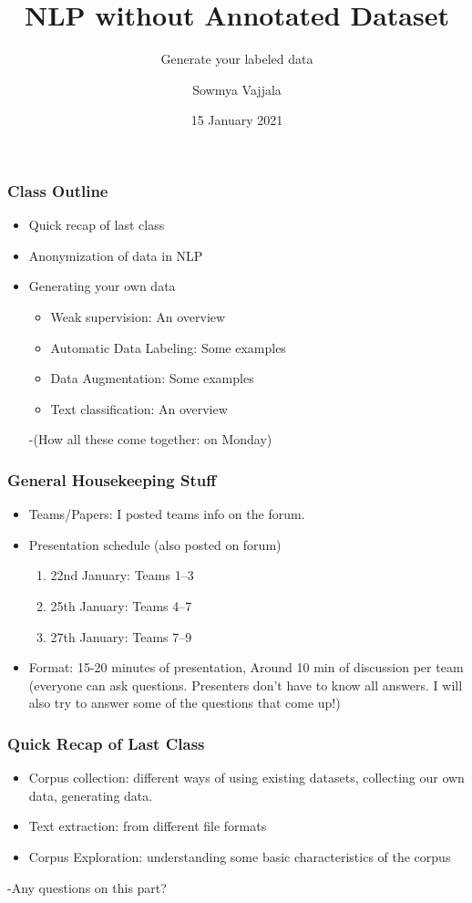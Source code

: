 \documentclass{beamer}
\author[Sowmya Vajjala]{Sowmya Vajjala}
\title[SfSNLP]{NLP without Annotated Dataset}
\subtitle{Generate your labeled data}
\date{15 January 2021}
\institute{Seminar f\"ur Sprachwissenschaft, University of T\"ubingen, Germany}
\begin{document}
\begin{frame}\titlepage
\end{frame}

\begin{frame}
\frametitle{Class Outline}
\begin{itemize}
    \item Quick recap of last class
    \item Anonymization of data in NLP 
    \item Generating your own data
        \begin{itemize}
    \item Weak supervision: An overview
    \item Automatic Data Labeling: Some examples
    \item Data Augmentation: Some examples
    \item Text classification: An overview
    \end{itemize}
-(How all these come together: on Monday)
\end{itemize}
\end{frame}

\begin{frame}
\frametitle{General Housekeeping Stuff}
\begin{itemize}
    \item Teams/Papers: I posted teams info on the forum.
    \item Presentation schedule  (also posted on forum)
    \begin{enumerate}
        \item 22nd January: Teams 1--3
        \item 25th January: Teams 4--7
        \item 27th January: Teams 7--9
    \end{enumerate}
    \item Format: 15-20 minutes of presentation, Around 10 min of discussion per team (everyone can ask questions. Presenters don't have to know all answers. I will also try to answer some of the questions that come up!)
\end{itemize}
\end{frame}

\begin{frame}
\frametitle{Quick Recap of Last Class}
\begin{itemize}
    \item Corpus collection: different ways of using existing datasets, collecting our own data, generating data.
    \item Text extraction: from different file formats
    \item Corpus Exploration: understanding some basic characteristics of the corpus
\end{itemize}
-Any questions on this part?
\end{frame}
\end{document}
